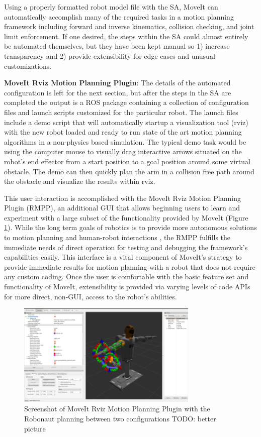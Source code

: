 \documentclass[10pt,journal,compsoc]{joser1}
\begin{document}
{Using a properly formatted robot model file with the SA, MoveIt can automatically accomplish many of the required tasks in a motion planning framework including forward and inverse kinematics, collision checking, and joint limit enforcement. If one desired, the steps within the SA could almost entirely be automated themselves, but they have been kept manual so 1) increase transparency and 2) provide extensibility for edge cases and unusual customizations.

{\bf MoveIt Rviz Motion Planning Plugin}: The details of the automated configuration is left for the next section, but after the steps in the SA are completed the output is a ROS package containing a collection of configuration files and launch scripts customized for the particular robot. The launch files include a demo script that will automatically startup a visualization tool (rviz) with the new robot loaded and ready to run state of the art motion planning algorithms in a non-physics based simulation. The typical demo task would be using the computer mouse to visually drag interactive arrows situated on the robot's end effector from a start position to a goal position around some virtual obstacle. The demo can then quickly plan the arm in a collision free path around the obstacle and visualize the results within rviz. 

This user interaction is accomplished with the MoveIt Rviz Motion Planning Plugin (RMPP), an additional GUI that allows beginning users to learn and experiment with a large subset of the functionality provided by MoveIt (Figure \ref{fig:motionrvizplugin}). While the long term goals of robotics is to provide more autonomous solutions to motion planning and human-robot interactions \cite{rescueRobots}, the RMPP fulfills the immediate needs of direct operation for testing and debugging the framework's capabilities easily. This interface is a vital component of MoveIt's strategy to provide immediate results for motion planning with a robot that does not require any custom coding. Once the user is comfortable with the basic feature set and functionality of MoveIt, extensibility is provided via varying levels of code APIs for more direct, non-GUI, access to the robot's abilities.

\begin{figure}[!t]
\centering
\includegraphics[width=3.4in]{images/rviz_plugin}
\caption{Screenshot of MoveIt Rviz Motion Planning Plugin with the Robonaut planning between two configurations TODO: better picture}
\label{fig:motionrvizplugin}
\end{figure}

}
\end{document}
